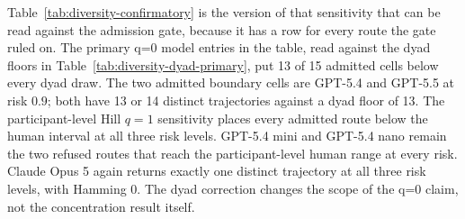 \documentclass[sigconf,anonymous]{aamas}
\begin{document}
Table~\ref{tab:diversity-confirmatory} is the version of that sensitivity that
can be read against the admission gate, because it has a row for every route
the gate ruled on. The primary q{=}0 model entries in the table, read against
the dyad floors in Table~\ref{tab:diversity-dyad-primary}, put 13 of 15 admitted
cells below every dyad draw. The two admitted boundary cells are GPT-5.4 and
GPT-5.5 at risk $0.9$; both have 13 or 14 distinct trajectories against a dyad
floor of 13. The participant-level Hill $q{=}1$ sensitivity places every
admitted route below the human interval at all three risk levels. GPT-5.4 mini
and GPT-5.4 nano remain the two refused routes that reach the participant-level
human range at every risk. Claude Opus 5 again returns exactly one distinct
trajectory at all three risk levels, with Hamming 0. The dyad correction changes
the scope of the q{=}0 claim, not the concentration result itself.
\end{document}

